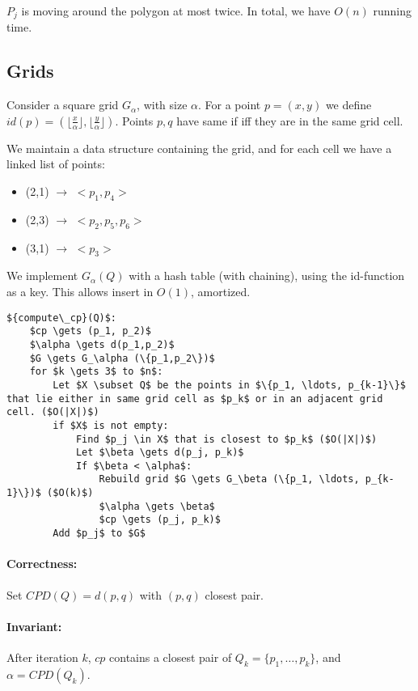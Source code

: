 $P_j$ is moving around the polygon at most twice. In total, we have $O(n)$ running time.

\subsection{Grids}

Consider a square grid $G_\alpha$, with size $\alpha$. For a point $p=(x,y)$ we define ${id}(p) = \left ( \lfloor \frac{x}{\alpha} \rfloor, \lfloor \frac{y}{\alpha} \rfloor \right )$. Points $p,q$ have same if iff they are in the same grid cell.

We maintain a data structure containing the grid, and for each cell we have a linked list of points:

\begin{itemize}
	\item (2,1) $\rightarrow$ $<p_1, p_4>$
	\item (2,3) $\rightarrow$ $<p_2, p_5, p_6>$
	\item (3,1) $\rightarrow$ $<p_3>$
\end{itemize}

We implement $G_\alpha(Q)$ with a hash table (with chaining), using the id-function as a key. This allows insert in $O(1)$, amortized.

\begin{lstlisting}[mathescape]
${compute\_cp}(Q)$:
	$cp \gets (p_1, p_2)$
	$\alpha \gets d(p_1,p_2)$
	$G \gets G_\alpha (\{p_1,p_2\})$
	for $k \gets 3$ to $n$:
		Let $X \subset Q$ be the points in $\{p_1, \ldots, p_{k-1}\}$ that lie either in same grid cell as $p_k$ or in an adjacent grid cell. ($O(|X|)$)
		if $X$ is not empty:
			Find $p_j \in X$ that is closest to $p_k$ ($O(|X|)$)
			Let $\beta \gets d(p_j, p_k)$
			If $\beta < \alpha$:
				Rebuild grid $G \gets G_\beta (\{p_1, \ldots, p_{k-1}\})$ ($O(k)$)
				$\alpha \gets \beta$
				$cp \gets (p_j, p_k)$
		Add $p_j$ to $G$
\end{lstlisting}

\paragraph{Correctness:} Set ${CPD}(Q) = d(p,q)$ with $(p,q)$ closest pair.

\paragraph{Invariant:} After iteration $k$, $cp$ contains a closest pair of $Q_k = \{p_1, \ldots, p_k\}$, and $\alpha = {CPD}(Q_k)$.

